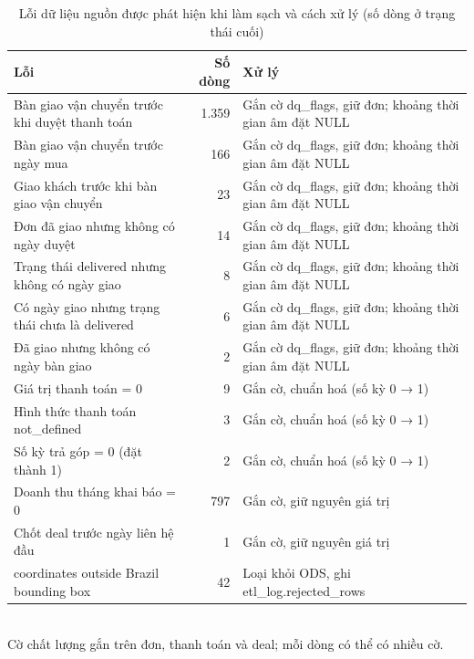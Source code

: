\begin{table}[htbp]
\centering\small
\caption{Lỗi dữ liệu nguồn được phát hiện khi làm sạch và cách xử lý (số dòng ở trạng thái cuối)}
\label{tab:dq-errors}
\begin{tabular}{p{6.2cm}rp{5.5cm}}
\toprule
\textbf{Lỗi} & \textbf{Số dòng} & \textbf{Xử lý} \\
\midrule
Bàn giao vận chuyển trước khi duyệt thanh toán & 1.359 & Gắn cờ dq\_flags, giữ đơn; khoảng thời gian âm đặt NULL \\
Bàn giao vận chuyển trước ngày mua & 166 & Gắn cờ dq\_flags, giữ đơn; khoảng thời gian âm đặt NULL \\
Giao khách trước khi bàn giao vận chuyển & 23 & Gắn cờ dq\_flags, giữ đơn; khoảng thời gian âm đặt NULL \\
Đơn đã giao nhưng không có ngày duyệt & 14 & Gắn cờ dq\_flags, giữ đơn; khoảng thời gian âm đặt NULL \\
Trạng thái delivered nhưng không có ngày giao & 8 & Gắn cờ dq\_flags, giữ đơn; khoảng thời gian âm đặt NULL \\
Có ngày giao nhưng trạng thái chưa là delivered & 6 & Gắn cờ dq\_flags, giữ đơn; khoảng thời gian âm đặt NULL \\
Đã giao nhưng không có ngày bàn giao & 2 & Gắn cờ dq\_flags, giữ đơn; khoảng thời gian âm đặt NULL \\
Giá trị thanh toán = 0 & 9 & Gắn cờ, chuẩn hoá (số kỳ 0 → 1) \\
Hình thức thanh toán not\_defined & 3 & Gắn cờ, chuẩn hoá (số kỳ 0 → 1) \\
Số kỳ trả góp = 0 (đặt thành 1) & 2 & Gắn cờ, chuẩn hoá (số kỳ 0 → 1) \\
Doanh thu tháng khai báo = 0 & 797 & Gắn cờ, giữ nguyên giá trị \\
Chốt deal trước ngày liên hệ đầu & 1 & Gắn cờ, giữ nguyên giá trị \\
coordinates outside Brazil bounding box & 42 & Loại khỏi ODS, ghi etl\_log.rejected\_rows \\
\bottomrule
\end{tabular}
\\[2pt]{\footnotesize Cờ chất lượng gắn trên đơn, thanh toán và deal; mỗi dòng có thể có nhiều cờ.}
\end{table}
